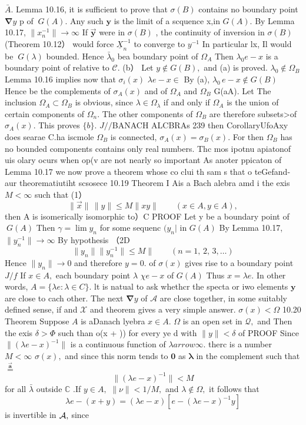 ${\bar{A}}.$ Lemma 10.16, it is sufficient to prove that $\sigma(B)$ contains no boundary point $\mathbf{\nabla}y$ p of $\ G(A).$ Any such $\mathbf{y}$ is the limit of a scquence {x,}in $G(A).$ By Lemma 10.17, $\|x_{n}^{-1}\|\to\infty$ If $\mathbf{\vec{y}}$ were in $\sigma(B)$ , the continuity of inversion in $\sigma(B)$ (Theorem 10.12） would force ${\underline{{X}}}_{n}^{-1}$ to converge to $y^{-1}$ In particular {lx, Il} would be $\ G(\lambda)$ bounded. Hence ${\bar{\lambda}}_{0}$ bea boundary point of ${\Omega}_{A}$ Then $\lambda_{0}e-x$ is a boundary point of relative to ${\mathcal{C}}.$ (b） Let $y\not\in G(B),$ and (a) is proved. $\lambda_{0}\notin\Omega_{B}$ Lemma 10.16 implies now that $\sigma_{i}(x)$ $\lambda e-x\in$ By (a), $\lambda_{0}\,e-x\notin G(B)$ Hence be the complements of $\sigma_{A}(x)$ and of $\Omega_{A}$ and $\Omega_{B}$ G(aA). Let The inclusion $\Omega_{A}\subset\Omega_{B}$ is obvious, since $\lambda\in\Omega_{\lambda}$ if and only if $\Omega_{A}$ is the union of certain components of $\scriptstyle\Omega_{n}.$ The other components of $\Omega_{B}$ are therefore subsets>of $\sigma_{A}(x).$ This proves $\{b\}.$ $J/\slash$BANACH ALCBRAs 239 then CorollaryUfoAxy does searae C.ha iscmole $\Omega_{B}$ is connected, $\sigma_{A}(x)=\sigma_{B}(x).$ For then $\Omega_{B}$ has no bounded components contains only real numbers. Thc mos ipotnu apiatonof uis olary ocurs when op(v are not nearly so important As anoter ppicaton of Lemma 10.17 we now prove a theorem whose co clui th sam s that o teGefand-aur theorematiutiht scsosece 10.19 Theorem I Ais a Bach alebra amd i the exis $M<\infty$ such that (1） $$ \|{\vec{x}}\|\,\|y\|\leq M\|x y\|\qquad(x\in A,y\in A), $$ then A is isomerically isomorphic to）C PROOF Let y be a boundary point of $\ G(A)$ Then $\gamma=\operatorname*{lim}y_{n}$ for some sequenc $\scriptstyle(y_{n}|$ in $G(A)$ By Lemma 10.17, $\|y_{n}^{-1}\|\to\infty$ By hypothesis （2D $$ \|y_{n}\|\lVert y_{n}^{-1}\rVert\leqslant M\rVert\qquad(n=1,\,2,\,3,\dots) $$ Hence $\|y_{n}\|\to0$ and therefore $y=0.$ of $\scriptstyle{\sigma(x)}$ gives rise to a boundary point $J/f$ If $x\in A,$ each boundary point $\lambda$ $\chi e-x$ of $\scriptstyle{G(A)}$ Thus $x=\lambda e.$ In other words, $A=\{\lambda e:\lambda\in C\}.$ lt is natual to ask whethcr the specta or iwo elements $\mathbf{y}$ are close to cach other. The next $\mathbf{\nabla}y$ of $\textstyle{\mathcal{A}}$ are close together, in some suitably defined sense, if and $\textstyle{\mathcal{X}}$ and theorem gives a very simple answer. $\sigma(x)<\Omega$ 10.20 Theorem Suppose $\textstyle A$ is aDanach lyebra $x\in A.$ $\Omega$ is an open set in ${\mathcal{Q}},$ and Then the exis $\delta>\Phi$ such than o(x + )) for every ye d with $\|y\|<\delta$ of PROOF Since $\|(\lambda e-x)^{-1}\|$ is a continuous function of $\lambda arrow\infty.$ therc is a number $M<\infty$ $\sigma(x),$ and since this norm tends to $\mathbf{0}$ as $\boldsymbol{\lambda}$ in the complement such that $\stackrel{\vec{\mathbf{a}}}{=}$ $$ \|(\lambda e-x)^{-1}\|<M $$ for all $\bar{\lambda}$ outside $\mathbb{C}$ .If $y\in A,$ $\|\nu\|<1/M,$ and $\lambda\notin\Omega,$ it follows that $$ \lambda e-(x+y)=(\lambda e-x)[e-(\lambda e-x)^{-1}y] $$ is invertible in ${\cal A},$ since 